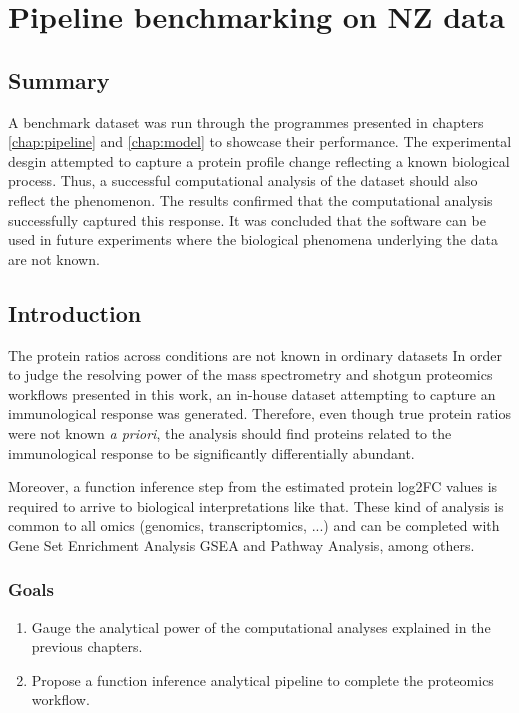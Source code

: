 \chapter{Pipeline benchmarking on \ac{NZ} data}
\label{chap:benchmark}

\section*{Summary}

A benchmark dataset was run through the programmes presented in chapters \ref{chap:pipeline} and \ref{chap:model} to showcase their performance. The experimental desgin attempted to capture a protein profile change reflecting a known biological process. Thus, a successful computational analysis of the dataset should also reflect the phenomenon. The results confirmed that the computational analysis successfully captured this response. It was concluded that the software can be used in future experiments where the biological phenomena underlying the data are not known.

\section{Introduction}

The protein ratios across conditions are not known in ordinary datasets In order to judge the resolving power of the mass spectrometry and shotgun proteomics workflows presented in this work, an in-house dataset attempting to capture an immunological response was generated. Therefore, even though true protein ratios were not known \textit{a priori}, the analysis should find proteins related to the immunological response to be significantly differentially abundant. 

Moreover, a function inference step from the estimated protein \ac{log2FC} values is required to arrive to biological interpretations like that. These kind of analysis is common to all omics (genomics, transcriptomics, ...) and can be completed with Gene Set Enrichment Analysis \ac{GSEA} and Pathway Analysis, among others.

\subsection{Goals}

\begin{enumerate}

\item Gauge the analytical power of the computational analyses explained in the previous chapters.


\item Propose a function inference analytical pipeline to complete the proteomics workflow.

\end{enumerate}



